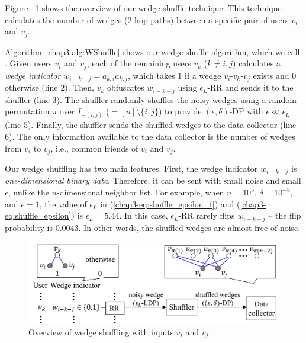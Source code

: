 Figure ~\ref{chap3-fig:wedge_shuffle} shows the overview of our wedge shuffle technique. 
This technique calculates the number of wedges (2-hop paths) between 
a specific pair of users $v_i$ and $v_j$. 

Algorithm~\ref{chap3-alg:WShuffle} shows our wedge shuffle algorithm, which we call \AlgWS{}. 
Given users $v_i$ and $v_j$, 
each of the remaining users $v_k$ ($k \ne i, j$) 
calculates a \textit{wedge indicator} $w_{i-k-j} = a_{k,i} a_{k,j}$, 
which 
takes $1$ if 
a wedge $v_i$-$v_k$-$v_j$ exists and $0$ otherwise (line 2). 
Then, $v_k$ obfuscates $w_{i-k-j}$ using $\epsilon_L$-RR and sends it to the shuffler (line 3). 
The shuffler randomly shuffles the noisy wedges using a random permutation $\pi$ over 
$I_{-(i,j)}$ ($=[n]\setminus\{i,j\}$) 
to provide $(\epsilon, \delta)$-DP with $\epsilon \ll \epsilon_L$ (line 5). 
Finally, the shuffler sends the shuffled wedges to the data collector (line 6). 
The only information available to the data collector is  the number of wedges from $v_i$ to $v_j$, i.e., 
common friends of $v_i$ and $v_j$. 

Our wedge shuffling has two main features. 
First, 
the wedge indicator $w_{i-k-j}$ is \textit{one-dimensional binary data}. 
Therefore, it can be sent with small noise and small $\epsilon$, unlike the $n$-dimensional neighbor list. 
For example, when $n=10^5$, $\delta=10^{-8}$, and $\epsilon=1$, the value of $\epsilon_L$ in (\ref{chap3-eq:shuffle_epsilon_f}) and (\ref{chap3-eq:shuffle_epsilon}) is $\epsilon_L = 5.44$. In this case, $\epsilon_L$-RR rarely flips $w_{i-k-j}$ -- the flip probability is $0.0043$. 
In other words, the shuffled wedges are almost free of noise. 

\begin{figure}[t]
  \centering
  \includegraphics[width=0.99\linewidth]{fig/wedge_shuffle.pdf}
  
  \caption[Overview of wedge shuffling.]{Overview of wedge shuffling with inputs $v_i$ and $v_j$. 
  }
  \label{chap3-fig:wedge_shuffle}
\end{figure}

